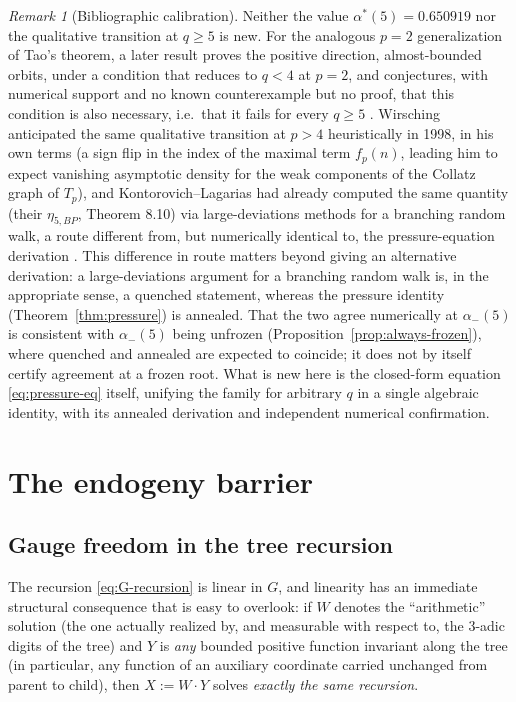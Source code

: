 \documentclass[11pt]{article}
\theoremstyle{definition}
\theoremstyle{remark}
\newtheorem{remark}[theorem]{Remark}
\begin{document}
\begin{remark}[Bibliographic calibration]\label{rem:novelty-109}
Neither the value $\alpha^\ast(5)=0.650919$ nor the qualitative
transition at $q\ge5$ is new. For the analogous $p=2$ generalization of
Tao's theorem, a later result proves the positive direction,
almost-bounded orbits, under a condition that reduces to $q<4$ at
$p=2$, and conjectures, with numerical support and no known
counterexample but no proof, that this condition is also necessary,
i.e.\ that it fails for every $q\ge5$
\cite[Theorem~1.3 and Conjecture~1.5]{GoncalvesGreenfeldMadrid2022}.
Wirsching \cite[Ch.~III, \S5,
following Theorem~5.2]{Wirsching1998} anticipated the same qualitative
transition at $p>4$ heuristically in 1998, in his own terms (a sign
flip in the index of the maximal term $f_p(n)$, leading him to expect
vanishing asymptotic density for the weak components of the Collatz
graph of $T_p$), and Kontorovich--Lagarias had already computed the
same quantity (their $\eta_{5,BP}$, Theorem 8.10) via large-deviations
methods for a branching random walk, a route different from, but
numerically identical to, the pressure-equation derivation
\cite{KontorovichLagarias2009}. This difference in route matters
beyond giving an alternative derivation: a large-deviations argument
for a branching random walk is, in the appropriate sense, a quenched
statement, whereas the pressure identity (Theorem~\ref{thm:pressure})
is annealed. That the two agree numerically at $\alpha_-(5)$ is
consistent with $\alpha_-(5)$ being unfrozen
(Proposition~\ref{prop:always-frozen}), where quenched and annealed
are expected to coincide; it does not by itself certify agreement at a
frozen root. What is new here is the closed-form equation
\eqref{eq:pressure-eq} itself, unifying the family for arbitrary $q$
in a single algebraic identity, with its annealed derivation and
independent numerical confirmation.
\end{remark}

\section{The endogeny barrier}
\label{sec:endogeny}

\subsection{Gauge freedom in the tree recursion}

The recursion \eqref{eq:G-recursion} is linear in $G$, and linearity
has an immediate structural consequence that is easy to overlook: if
$W$ denotes the ``arithmetic'' solution (the one actually realized
by, and measurable with respect to, the $3$-adic digits of the tree)
and $Y$ is \emph{any} bounded positive function invariant along
the tree (in particular, any function of an auxiliary coordinate
carried unchanged from parent to child), then $X := W\cdot Y$ solves
\emph{exactly the same recursion}.
\end{document}
